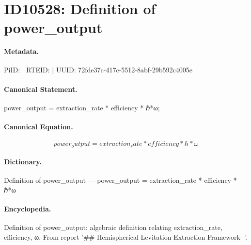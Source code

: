 \section*{ID10528: Definition of power\_output}
\paragraph{Metadata.}
PiID:  | RTEID:  | UUID: 72fde37c-417c-5512-8abf-29b592c4005e

\paragraph{Canonical Statement.}
power\_output = extraction\_rate * efficiency * ℏ*ω;

\paragraph{Canonical Equation.}
\[
power_output = extraction_rate * efficiency * ℏ*ω
\]

\paragraph{Dictionary.}
Definition of power\_output — power\_output = extraction\_rate * efficiency * ℏ*ω

\paragraph{Encyclopedia.}
Definition of power\_output: algebraic definition relating extraction\_rate, efficiency, ω. From report '\#\# Hemispherical Levitation-Extraction Framework- '.
